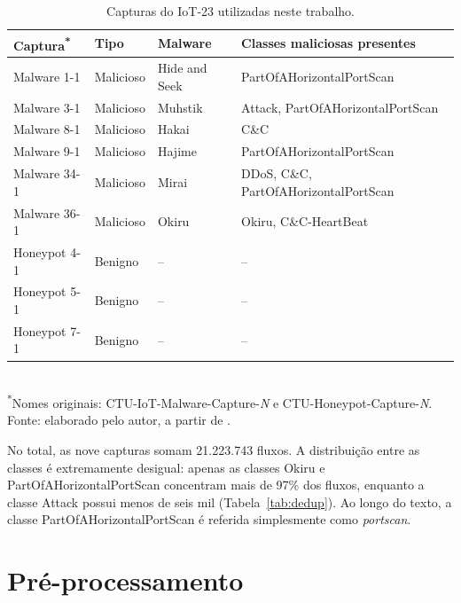\begin{table}[htbp]
\centering
\caption{Capturas do IoT-23 utilizadas neste trabalho.}
\label{tab:cenarios}
\begin{tabular}{lll>{\raggedright\arraybackslash}p{}}
\toprule
\textbf{Captura}\textsuperscript{*} & \textbf{Tipo} & \textbf{Malware} & \textbf{Classes maliciosas presentes} \\
\midrule
Malware 1-1   & Malicioso & Hide and Seek & PartOfAHorizontalPortScan \\
Malware 3-1   & Malicioso & Muhstik       & Attack, PartOfAHorizontalPortScan \\
Malware 8-1   & Malicioso & Hakai         & C\&C \\
Malware 9-1   & Malicioso & Hajime        & PartOfAHorizontalPortScan \\
Malware 34-1  & Malicioso & Mirai         & DDoS, C\&C, PartOfAHorizontalPortScan \\
Malware 36-1  & Malicioso & Okiru         & Okiru, C\&C-HeartBeat \\
Honeypot 4-1      & Benigno   & --            & -- \\
Honeypot 5-1      & Benigno   & --            & -- \\
Honeypot 7-1      & Benigno   & --            & -- \\
\bottomrule
\end{tabular}
\\[2pt]
\small{\textsuperscript{*}Nomes originais: CTU-IoT-Malware-Capture-\textit{N} e CTU-Honeypot-Capture-\textit{N}.}\\
\small{Fonte: elaborado pelo autor, a partir de .}
\end{table}

No total, as nove capturas somam 21.223.743 fluxos. A distribuição entre as classes é extremamente desigual: apenas as classes Okiru e PartOfAHorizontalPortScan concentram mais de 97\% dos fluxos, enquanto a classe Attack possui menos de seis mil (Tabela~\ref{tab:dedup}). Ao longo do texto, a classe PartOfAHorizontalPortScan é referida simplesmente como \textit{portscan}.

\section{Pré-processamento}
\label{sec:preprocessamento}

